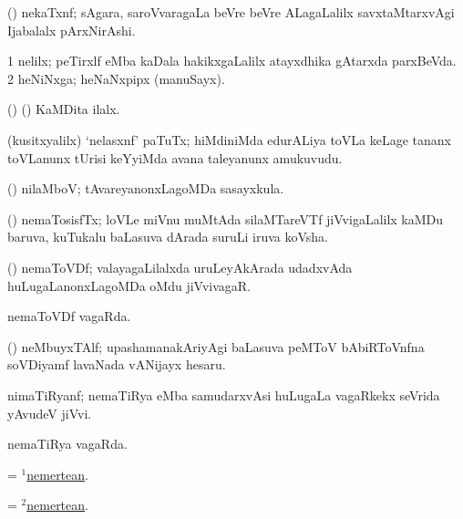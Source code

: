 \bentry
{}
\gl{\nA}
\bmng
(\pArxvi) nekaTxnf; sAgara, saroVvaragaLa beVre beVre ALagaLalilx savxtaMtarxvAgi Ijabalalx pArxNirAshi. 
\emng
\eentry

\bentry
{}
\gl{\nA}
\bmng
\bnum
\num{1} nelilx; peTirxlf eMba kaDala hakikxgaLalilx atayxdhika gAtarxda parxBeVda. 
\num{2} heNiNxga; heNaNxpipx (manuSayx). 
\enum
\emng

\noindent
\gl{\pagu}
\bmng
{} (\birx) (\ashi) KaMDita ilalx. 
\emng
\eentry

\bentry
{}
\gl{\nA}
\bmng
(kusitxyalilx) `nelasxnf' paTuTx; hiMdiniMda edurALiya toVLa keLage tananx toVLanunx tUrisi keYyiMda avana taleyanunx amukuvudu. 
\emng
\eentry

\bentry
{}
\gl{\nA}
\bmng
(\savi) nilaMboV; tAvareyanonxLagoMDa sasayxkula. 
\emng
\eentry

\bentry
{}
\gl{\nA}
\bmng
(\savi) nemaTosisfTx; loVLe miVnu muMtAda silaMTareVTf jiVvigaLalilx kaMDu baruva, kuTukalu baLasuva dArada suruLi iruva koVsha. 
\emng
\eentry

\bentry
{}
\gl{\nA}
\bmng
(\jiVvi) nemaToVDf; valayagaLilalxda uruLeyAkArada udadxvAda huLugaLanonxLagoMDa oMdu jiVvivagaR. 
\emng
\eentry

\bentry
{}
\gl{\gu}
\bmng
nemaToVDf vagaRda. 
\emng
\eentry

\bentry
{}
\gl{\nA}
\bmng
(\ravi) neMbuyxTAlf; upashamanakAriyAgi baLasuva peMToV bAbiRToVnfna soVDiyamf lavaNada vANijayx hesaru. 
\emng
\eentry

\bentry
{}
\pron{}
\gl{\saMkiSx}
\expl{\Latin} 
\bmng
{} 
\emng
\eentry

\bentry
{}
\gl{\nA}
\bmng
nimaTiRyanf; nemaTiRya eMba samudarxvAsi huLugaLa vagaRkekx seVrida yAvudeV jiVvi. 
\emng
\eentry

\bentry
{}
\gl{\gu}
\bmng
nemaTiRya vagaRda. 
\emng
\eentry

\bentry
{}
\gl{\nA}
\bmng
= \hyperlink{nemertean(1)}{$^1$nemertean}. 
\emng
\eentry

\bentry
{}
\gl{\gu}
\bmng
= \hyperlink{nemertean(2)}{$^2$nemertean}. 
\emng
\eentry

